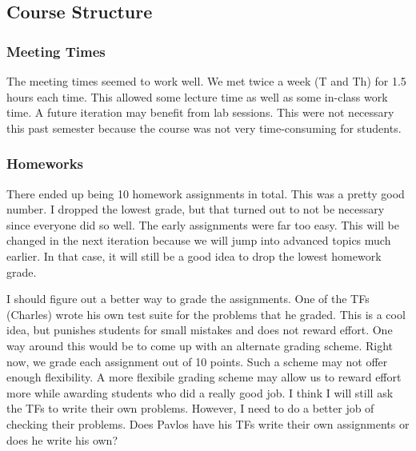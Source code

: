 \documentclass[11pt]{article}
\begin{document}
    \subsection{Course Structure}
      \subsubsection{Meeting Times}
        The meeting times seemed to work well.  We met twice a week (T and Th)
for 1.5 hours each time.  This allowed some lecture time as well as some
in-class work time.  A future iteration may benefit from lab sessions.  This
were not necessary this past semester because the course was not very
time-consuming for students.
      \subsubsection{Homeworks}
        There ended up being 10 homework assignments in total.  This was a
pretty good number.  I dropped the lowest grade, but that turned out to not be
necessary since everyone did so well.  The early assignments were far too easy.
This will be changed in the next iteration because we will jump into advanced
topics much earlier.  In that case, it will still be a good idea to drop the
lowest homework grade.

        I should figure out a better way to grade the assignments.  One of the
TFs (Charles) wrote his own test suite for the problems that he graded.  This is
a cool idea, but punishes students for small mistakes and does not reward
effort.  One way around this would be to come up with an alternate grading
scheme.  Right now, we grade each assignment out of 10 points.  Such a scheme
may not offer enough flexibility.  A more flexibile grading scheme may allow us
to reward effort more while awarding students who did a really good job.  I
think I will still ask the TFs to write their own problems.  However, I need to
do a better job of checking their problems.  Does Pavlos have his TFs write
their own assignments or does he write his own?
\end{document}
